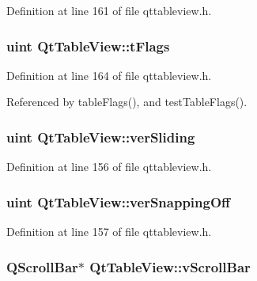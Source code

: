 Definition at line 161 of file qttableview.\+h.

\hypertarget{classQtTableView_a57f95cb2930e49d4cdd03c67305e6b25}{
\subsubsection[{t\+Flags}]{\setlength{\rightskip}{0pt plus 5cm}uint Qt\+Table\+View\+::t\+Flags\hspace{0.3cm}{\ttfamily [private]}}}\label{classQtTableView_a57f95cb2930e49d4cdd03c67305e6b25}


Definition at line 164 of file qttableview.\+h.



Referenced by table\+Flags(), and test\+Table\+Flags().

\hypertarget{classQtTableView_a38d4c817c3cd984937984fc408c1ed49}{
\subsubsection[{ver\+Sliding}]{\setlength{\rightskip}{0pt plus 5cm}uint Qt\+Table\+View\+::ver\+Sliding\hspace{0.3cm}{\ttfamily [private]}}}\label{classQtTableView_a38d4c817c3cd984937984fc408c1ed49}


Definition at line 156 of file qttableview.\+h.

\hypertarget{classQtTableView_a3ddcc6656b6529d18cee324790c18d30}{
\subsubsection[{ver\+Snapping\+Off}]{\setlength{\rightskip}{0pt plus 5cm}uint Qt\+Table\+View\+::ver\+Snapping\+Off\hspace{0.3cm}{\ttfamily [private]}}}\label{classQtTableView_a3ddcc6656b6529d18cee324790c18d30}


Definition at line 157 of file qttableview.\+h.

\hypertarget{classQtTableView_a142d31c4fd64cc9bfd5fcba8e2c2f206}{
\subsubsection[{v\+Scroll\+Bar}]{\setlength{\rightskip}{0pt plus 5cm}Q\+Scroll\+Bar$\ast$ Qt\+Table\+View\+::v\+Scroll\+Bar\hspace{0.3cm}{\ttfamily [private]}}}\label{classQtTableView_a142d31c4fd64cc9bfd5fcba8e2c2f206}


